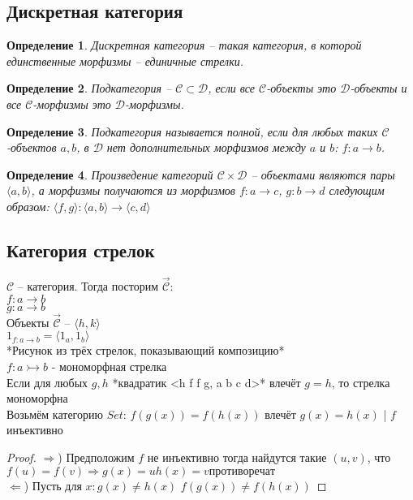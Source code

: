 \documentclass[a4paper, fleqn, draft]{report}
\newtheorem*{defn}{Определение}
\begin{document}
\subsection{Дискретная категория}
\begin{defn}
Дискретная категория -- такая категория, в которой единственные морфизмы --
единичные стрелки.
\end{defn}
\begin{defn}
Подкатегория -- $\mathcal{C} \subset \mathcal{D}$, если все $\mathcal{C}$-объекты это $\mathcal{D}$-объекты и все
$\mathcal{C}$-морфизмы это $\mathcal{D}$-морфизмы.
\end{defn}
\begin{defn}
Подкатегория называется полной, если для любых таких $\mathcal{C}$-объектов $a, b$, в $\mathcal{D}$ нет
дополнительных морфизмов между $a$ и $b$: $f\colon a \to b$.
\end{defn}
\begin{defn}
Произведение категорий $\mathcal{C} \times \mathcal{D}$ -- объектами являются пары $\langle a, b \rangle$,
а морфизмы получаются из морфизмов $f\colon a \to c$, $g\colon b \to d$ следующим образом:
$\langle f, g \rangle\colon \langle a, b \rangle \to \langle c,d \rangle$
\end{defn}

\subsection{Категория стрелок}
$\mathcal{C}$ -- категория. Тогда посторим $\overrightarrow{\mathcal{C}}$: \\
$f\colon a \to b$ \\
$g\colon a \to b$ \\

Объекты $\overrightarrow{\mathcal{C}}$ -- $\langle h, k \rangle$ \\
$1_{f\colon a \to b} = \langle 1_a, 1_b \rangle$ \\

*Рисунок из трёх стрелок, показывающий композицию* \\

$f\colon a \rightarrowtail b$ - мономорфная стрелка \\
Если для любых $g, h$ *квадратик <h f f g, a b c d>* влечёт $g = h$, то стрелка
мономорфна \\

Возьмём категорию $Set$: $f(g(x)) = f(h(x))$ влечёт $g(x)=h(x)$ | $f$ инъективно
\begin{proof}
  $\Rightarrow$) Предположим $f$ не инъективно тогда найдутся такие $(u, v)$, что $f(u) = f(v)
  \Rightarrow g(x) = u h(x) = v противоречат$ \\
  $\Leftarrow$) Пусть для $x: g(x) \ne h(x)$ $f(g(x)) \ne f(h(x))$
\end{proof}
\end{document}
